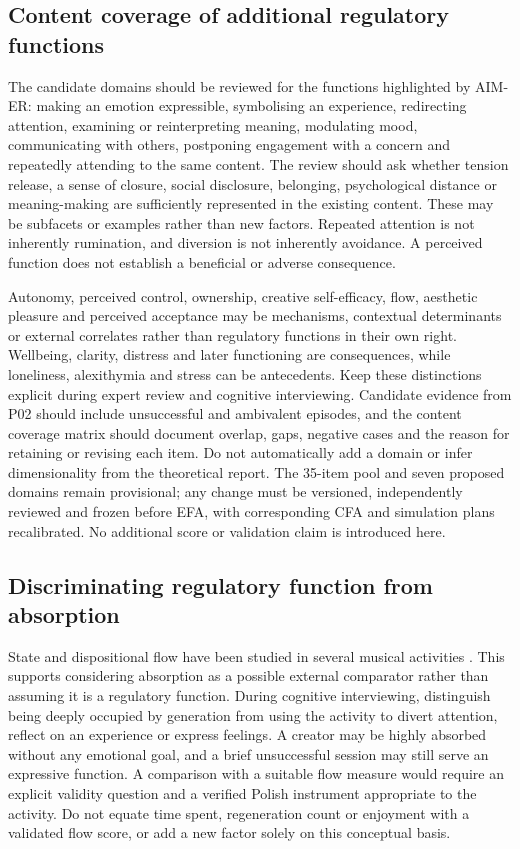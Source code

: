 \subsection{Content coverage of additional regulatory functions}
The candidate domains should be reviewed for the functions highlighted by AIM-ER: making an emotion expressible, symbolising an experience, redirecting attention, examining or reinterpreting meaning, modulating mood, communicating with others, postponing engagement with a concern and repeatedly attending to the same content. The review should ask whether tension release, a sense of closure, social disclosure, belonging, psychological distance or meaning-making are sufficiently represented in the existing content. These may be subfacets or examples rather than new factors. Repeated attention is not inherently rumination, and diversion is not inherently avoidance. A perceived function does not establish a beneficial or adverse consequence.

Autonomy, perceived control, ownership, creative self-efficacy, flow, aesthetic pleasure and perceived acceptance may be mechanisms, contextual determinants or external correlates rather than regulatory functions in their own right. Wellbeing, clarity, distress and later functioning are consequences, while loneliness, alexithymia and stress can be antecedents. Keep these distinctions explicit during expert review and cognitive interviewing. Candidate evidence from P02 should include unsuccessful and ambivalent episodes, and the content coverage matrix should document overlap, gaps, negative cases and the reason for retaining or revising each item. Do not automatically add a domain or infer dimensionality from the theoretical report. The 35-item pool and seven proposed domains remain provisional; any change must be versioned, independently reviewed and frozen before EFA, with corresponding CFA and simulation plans recalibrated. No additional score or validation claim is introduced here.

\subsection{Discriminating regulatory function from absorption}
State and dispositional flow have been studied in several musical activities \parencite{chirico2015}. This supports considering absorption as a possible external comparator rather than assuming it is a regulatory function. During cognitive interviewing, distinguish being deeply occupied by generation from using the activity to divert attention, reflect on an experience or express feelings. A creator may be highly absorbed without any emotional goal, and a brief unsuccessful session may still serve an expressive function. A comparison with a suitable flow measure would require an explicit validity question and a verified Polish instrument appropriate to the activity. Do not equate time spent, regeneration count or enjoyment with a validated flow score, or add a new factor solely on this conceptual basis.

